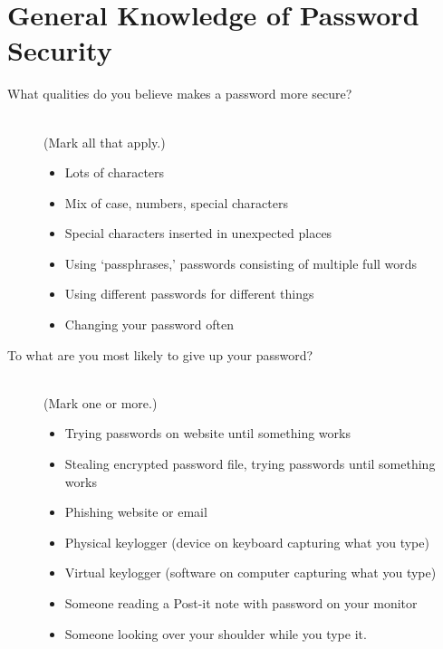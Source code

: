 \documentclass{article}
\begin{document}
  \section{General Knowledge of Password Security}
    \begin{description}
      \item[What qualities do you believe makes a password more secure?]
        \mbox{}\\ {\small (Mark all that apply.)}
        \begin{itemize}
          \renewcommand{\labelitemi}{\scriptsize$\circ$}
          \item Lots of characters
          \item Mix of case, numbers, special characters
          \item Special characters inserted in unexpected places
          \item Using `passphrases,' passwords consisting of multiple full words
          \item Using different passwords for different things
          \item Changing your password often
        \end{itemize}
      \item[To what are you most likely to give up your password?]
        \mbox{}\\ {\small (Mark one or more.)}
        \begin{itemize}
          \renewcommand{\labelitemi}{\scriptsize$\circ$}
          \item Trying passwords on website until something works
          \item Stealing encrypted password file, trying passwords until something works
          \item Phishing website or email
          \item Physical keylogger (device on keyboard capturing what you type)
          \item Virtual keylogger (software on computer capturing what you type)
          \item Someone reading a Post-it note with password on your monitor
          \item Someone looking over your shoulder while you type it.
        \end{itemize}
    \end{description}
\end{document}
